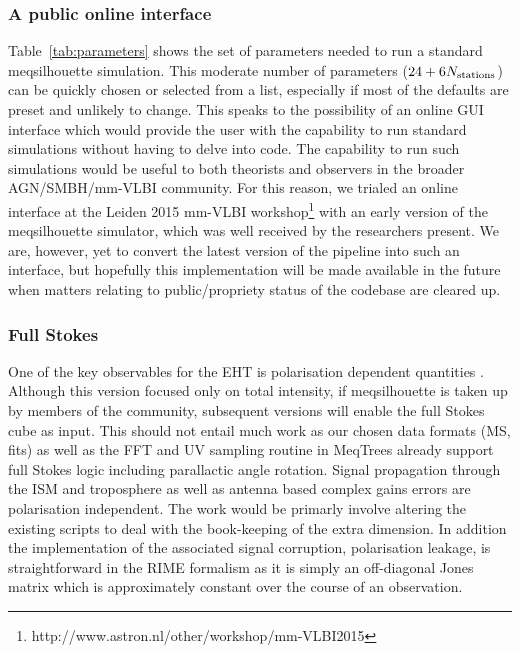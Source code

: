 \subsubsection{A public online interface}
Table~\ref{tab:parameters} shows the set of parameters needed to run a standard {\sc meqsilhouette} simulation. This moderate number of parameters ($24+6N_{\rm stations}$) can be quickly chosen or selected from a list, especially if most of the defaults are preset and unlikely to change. This speaks to the possibility of an online GUI interface which would provide the user with the capability to run standard simulations without having to delve into code. The capability to run such simulations would be useful to both theorists and observers in the broader AGN/SMBH/mm-VLBI community. For this reason, we trialed an online interface at the Leiden 2015 mm-VLBI workshop\footnote{http://www.astron.nl/other/workshop/mm-VLBI2015} with an early version of the {\sc meqsilhouette} simulator, which was well received by the researchers present. We are, however, yet to convert the latest version of the pipeline \citep{Blecher_2016} into such an interface, but hopefully this implementation will be made available in the future when matters relating to public/propriety status of the codebase are cleared up.


\subsubsection{Full Stokes}
One of the key observables for the EHT is polarisation dependent quantities \citep{Johnson_2015b}. Although this version focused only on total intensity, if {\sc meqsilhouette} is taken up by members of the community, subsequent versions will enable the full Stokes cube as input. This should not entail much work as our chosen data formats (MS, {\sc fits}) as well as the FFT and UV sampling routine in {\sc MeqTrees} already support full Stokes logic including parallactic angle rotation. Signal propagation through the ISM and troposphere as well as antenna based complex gains errors are polarisation independent. The work would be primarly involve altering the existing scripts to deal with the book-keeping of the extra dimension. In addition the implementation of the associated signal corruption, polarisation leakage, is straightforward in the RIME formalism as it is simply an off-diagonal Jones matrix which is approximately constant over the course of an observation.

